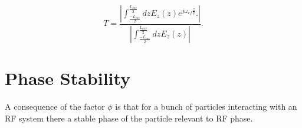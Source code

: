\begin{equation}
T =    \frac{\left| \int^{\frac{L_{cav}}{2}}_{\frac{-L_{cav}}{2}} dz E_{z}\left( z \right) e^{j \omega_{rf} \frac{z}{v}}.\right|}{  \left| \int^{\frac{L_{cav}}{2}}_{\frac{-L_{cav}}{2}} dz E_{z}\left( z \right) \right|}.
\end{equation}

\section{Phase Stability}

A consequence of the factor $\phi$ is that for a bunch of particles interacting with an RF system there a stable phase of the particle relevant to RF phase. 